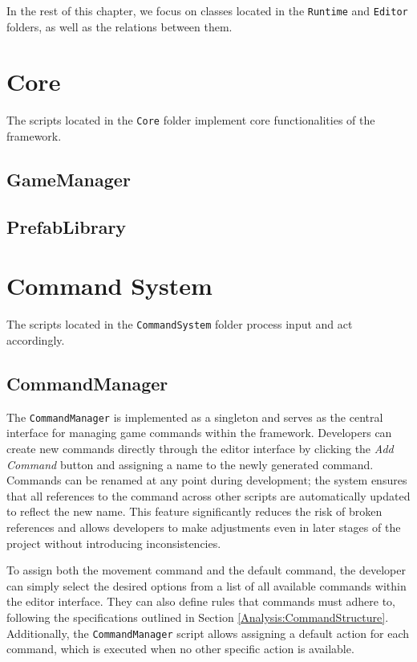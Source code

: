 In the rest of this chapter, we focus on classes located in the \verb|Runtime| and \verb|Editor| folders, as well as the relations between them.

\section{Core}
The scripts located in the \verb|Core| folder implement core functionalities of the framework.

\subsection{GameManager}


\subsection{PrefabLibrary}


\section{Command System}
The scripts located in the \verb|CommandSystem| folder process input and act accordingly.

\subsection{CommandManager}
The \verb|CommandManager| is implemented as a singleton and serves as the central interface for managing game commands within the framework. Developers can create new commands directly through the editor interface by clicking the \textit{Add Command} button and assigning a name to the newly generated command. Commands can be renamed at any point during development; the system ensures that all references to the command across other scripts are automatically updated to reflect the new name. This feature significantly reduces the risk of broken references and allows developers to make adjustments even in later stages of the project without introducing inconsistencies.

To assign both the movement command and the default command, the developer can simply select the desired options from a list of all available commands within the editor interface. They can also define rules that commands must adhere to, following the specifications outlined in Section \ref{Analysis:CommandStructure}. Additionally, the \verb|CommandManager| script allows assigning a default action for each command, which is executed when no other specific action is available.

